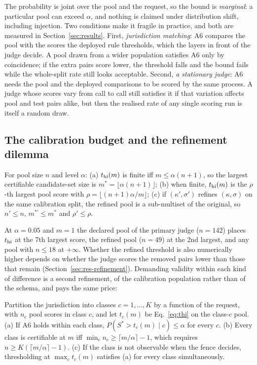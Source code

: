 The probability is joint over the pool and the request, so the bound is \emph{marginal}: a particular pool can exceed $\alpha$, and nothing is claimed under distribution shift, including injection. Two conditions make it fragile in practice, and both are measured in Section~\ref{sec:results}. First, \emph{jurisdiction matching}: A6 compares the pool with the scores the deployed rule thresholds, which the layers in front of the judge decide. A pool drawn from a wider population satisfies A6 only by coincidence; if the extra pairs score lower, the threshold falls and the bound fails while the whole-split rate still looks acceptable. Second, \emph{a stationary judge}: A6 needs the pool and the deployed comparisons to be scored by the same process. A judge whose scores vary from call to call still satisfies it if that variation affects pool and test pairs alike, but then the realised rate of any single scoring run is itself a random draw.

\subsection{The calibration budget and the refinement dilemma}\label{sec:dilemma}

\begin{proposition}\label{prop:dilemma}
For pool size $n$ and level $\alpha$: (a) $t_{\mathrm{hi}}(m)$ is finite iff $m\le\alpha(n+1)$, so the largest certifiable candidate-set size is $m^\ast=\lfloor\alpha(n+1)\rfloor$; (b) when finite, $t_{\mathrm{hi}}(m)$ is the $\rho$-th largest pool score with $\rho=\lfloor(n+1)\alpha/m\rfloor$; (c) if $(\kappa',\sigma')$ refines $(\kappa,\sigma)$ on the same calibration split, the refined pool is a sub-multiset of the original, so $n'\le n$, $m^{\ast\prime}\le m^\ast$ and $\rho'\le\rho$.
\end{proposition}

At $\alpha=0.05$ and $m=1$ the declared pool of the primary judge ($n=142$) places $t_{\mathrm{hi}}$ at the 7th largest score, the refined pool ($n=49$) at the 2nd largest, and any pool with $n\le18$ at $+\infty$. Whether the refined threshold is also numerically higher depends on whether the judge scores the removed pairs lower than those that remain (Section~\ref{sec:res-refinement}). Demanding validity within each kind of difference is a second refinement, of the calibration population rather than of the schema, and pays the same price:

\begin{corollary}\label{cor:mondrian}
Partition the jurisdiction into classes $c=1,\dots,K$ by a function of the request, with $n_c$ pool scores in class $c$, and let $t_c(m)$ be Eq.~\eqref{eq:thi} on the class-$c$ pool. (a) If A6 holds within each class, $P(S^\ast>t_c(m)\mid c)\le\alpha$ for every $c$. (b) Every class is certifiable at $m$ iff $\min_cn_c\ge\lceil m/\alpha\rceil-1$, which requires $n\ge K(\lceil m/\alpha\rceil-1)$. (c) If the class is not observable when the fence decides, thresholding at $\max_ct_c(m)$ satisfies (a) for every class simultaneously.
\end{corollary}

